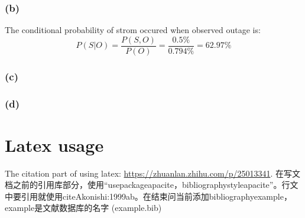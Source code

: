 \documentclass[a4paper]{article}
\begin{document}
\subsubsection{(b)}
The conditional probability of strom occured when observed outage is:
\begin{equation}
	P(S|O)=\frac{P(S,O)}{P(O)}=\frac{0.5 \%}{0.794 \%}=62.97 \%
\end{equation}
\subsubsection{(c)}
\subsubsection{(d)}


\section{Latex usage}
The citation part of using latex: \url{https://zhuanlan.zhihu.com/p/25013341}.
在写文档之前的引用库部分，使用“usepackage{apacite}，bibliographystyle{apacite}”。行文中要引用就使用citeA{konishi:1999ab}。在结束问当前添加bibliography{example}，example是文献数据库的名字 (example.bib)



\end{document}
